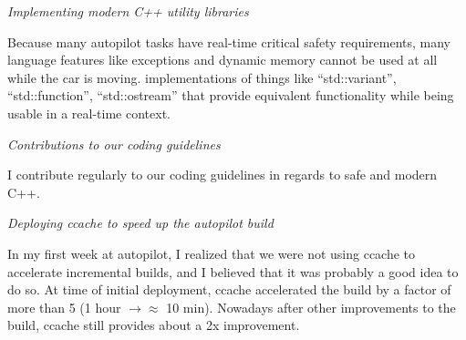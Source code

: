 \documentclass[margin,line]{resume}
\begin{document}
\begin{resume}
\newpage
    
    \textsl{Implementing modern C++ utility libraries}
    
    Because many autopilot tasks have real-time critical safety requirements, many language features like exceptions
    and dynamic memory cannot be used at all while the car is moving.
    implementations of things like ``std::variant'', ``std::function'', ``std::ostream'' that provide equivalent functionality while being usable in a real-time context.

    \textsl{Contributions to our coding guidelines}

	I contribute regularly to our coding guidelines in regards to safe and modern C++.

    \textsl{Deploying ccache to speed up the autopilot build}
    
    In my first week at autopilot, I realized that we were not using ccache to accelerate incremental builds, and I believed
    that it was probably a good idea to do so. At time of initial deployment, ccache accelerated the build by a factor of more than 5 (1 hour $\rightarrow \approx$ 10 min).
    Nowadays after other improvements to the build, ccache still provides about a 2x improvement.



       


\end{resume}
\end{document}
